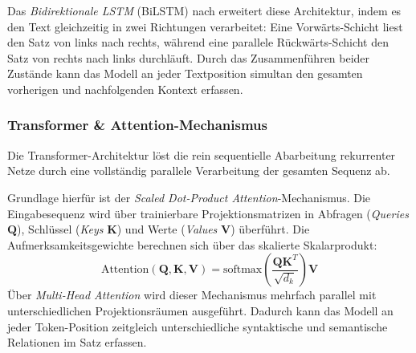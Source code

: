 Das \textit{Bidirektionale LSTM} (BiLSTM) nach \citet{schuster1997bidirectional} erweitert diese Architektur, indem es den Text gleichzeitig in zwei Richtungen verarbeitet: Eine Vorwärts-Schicht liest den Satz von links nach rechts, während eine parallele Rückwärts-Schicht den Satz von rechts nach links durchläuft. Durch das Zusammenführen beider Zustände kann das Modell an jeder Textposition simultan den gesamten vorherigen und nachfolgenden Kontext erfassen.

\subsubsection{Transformer \& Attention-Mechanismus}
Die Transformer-Architektur \citep{vaswani2017attention} löst die rein sequentielle Abarbeitung rekurrenter Netze durch eine vollständig parallele Verarbeitung der gesamten Sequenz ab.

Grundlage hierfür ist der \textit{Scaled Dot-Product Attention}-Mechanismus. Die Eingabesequenz wird über trainierbare Projektionsmatrizen in Abfragen (\textit{Queries} $\mathbf{Q}$), Schlüssel (\textit{Keys} $\mathbf{K}$) und Werte (\textit{Values} $\mathbf{V}$) überführt. Die Aufmerksamkeitsgewichte berechnen sich über das skalierte Skalarprodukt:
\begin{equation}
    \text{Attention}(\mathbf{Q}, \mathbf{K}, \mathbf{V}) = \text{softmax}\left( \frac{\mathbf{Q} \mathbf{K}^T}{\sqrt{d_k}} \right) \mathbf{V}
\end{equation}
Über \textit{Multi-Head Attention} wird dieser Mechanismus mehrfach parallel mit unterschiedlichen Projektionsräumen ausgeführt. Dadurch kann das Modell an jeder Token-Position zeitgleich unterschiedliche syntaktische und semantische Relationen im Satz erfassen.

